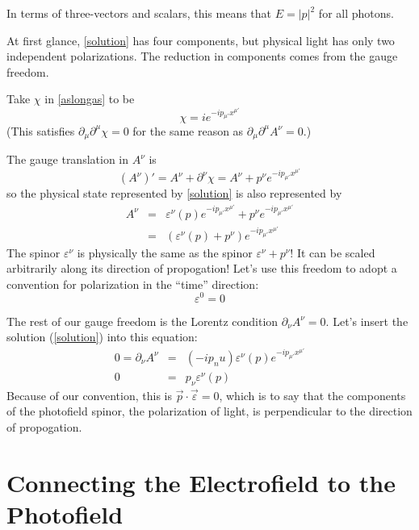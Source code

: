 \documentclass[12pt]{article}
\begin{document}
In terms of three-vectors and scalars, this means that $E = |p|^2$ for
all photons.

At first glance, \ref{solution} has four components, but physical
light has only two independent polarizations.  The reduction in
components comes from the gauge freedom.

Take $\chi$ in \ref{aslongas} to be
\begin{equation}
  \chi = ie^{-i p_{\mu'} x^{\mu'}}
\end{equation}
(This satisfies $\partial_\mu \partial^\mu \chi = 0$ for the same
reason as $\partial_\mu \partial^\mu A^\nu = 0$.)

The gauge translation in $A^\nu$ is
\begin{equation}
  (A^\nu)' = A^\nu + \partial^\nu \chi = A^\nu + p^\nu e^{-i p_{\mu'} x^{\mu'}}
\end{equation}
so the physical state represented by \ref{solution} is also
represented by 
\begin{eqnarray}
  A^\nu &=& \varepsilon^\nu(p) e^{-i p_{\mu'} x^{\mu'}} + p^\nu e^{-i p_{\mu'} x^{\mu'}} \\
  &=& (\varepsilon^\nu(p) + p^\nu) e^{-i p_{\mu'} x^{\mu'}}
\end{eqnarray}
The spinor $\varepsilon^\nu$ is physically the same as the spinor
$\varepsilon^\nu + p^\nu$!  It can be scaled arbitrarily along its
direction of propogation!  Let's use this freedom to adopt a
convention for polarization in the ``time'' direction:
\begin{equation}
  \varepsilon^0 = 0
\end{equation}

The rest of our gauge freedom is the Lorentz condition $\partial_\nu
A^\nu = 0$.  Let's insert the solution (\ref{solution}) into this
equation:
\begin{eqnarray}
  0 = \partial_\nu A^\nu &=& (-i p_nu) \varepsilon^\nu(p) e^{-i p_{\mu'} x^{\mu'}} \\
  0 &=& p_\nu \varepsilon^\nu(p)
\end{eqnarray}
Because of our convention, this is $\vec{p} \cdot \vec{\varepsilon} =
0$, which is to say that the components of the photofield spinor, the
polarization of light, is perpendicular to the direction of
propogation.

\section{Connecting the Electrofield to the Photofield}
\end{document}
